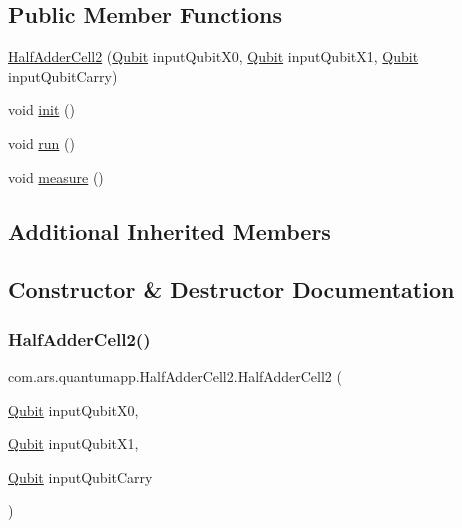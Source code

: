 \subsection*{Public Member Functions}
\begin{DoxyCompactItemize}
\item 
\hyperlink{classcom_1_1ars_1_1quantumapp_1_1_half_adder_cell2_a1369d2837b586d8e6076476b7ea03058}{Half\+Adder\+Cell2} (\hyperlink{classcom_1_1ars_1_1qubits_1_1_qubit}{Qubit} input\+Qubit\+X0, \hyperlink{classcom_1_1ars_1_1qubits_1_1_qubit}{Qubit} input\+Qubit\+X1, \hyperlink{classcom_1_1ars_1_1qubits_1_1_qubit}{Qubit} input\+Qubit\+Carry)
\item 
void \hyperlink{classcom_1_1ars_1_1quantumapp_1_1_half_adder_cell2_a9962ffb8cd54b25f0c696e7c06882195}{init} ()
\item 
void \hyperlink{classcom_1_1ars_1_1quantumapp_1_1_half_adder_cell2_a4552a018b3fdd228fb7d851be827754c}{run} ()
\item 
void \hyperlink{classcom_1_1ars_1_1quantumapp_1_1_half_adder_cell2_ace7018ecff35605ac317049d2584db13}{measure} ()
\end{DoxyCompactItemize}
\subsection*{Additional Inherited Members}


\subsection{Constructor \& Destructor Documentation}
\hypertarget{classcom_1_1ars_1_1quantumapp_1_1_half_adder_cell2_a1369d2837b586d8e6076476b7ea03058}{}\label{classcom_1_1ars_1_1quantumapp_1_1_half_adder_cell2_a1369d2837b586d8e6076476b7ea03058} 
\subsubsection{\texorpdfstring{Half\+Adder\+Cell2()}{HalfAdderCell2()}}
{\footnotesize\ttfamily com.\+ars.\+quantumapp.\+Half\+Adder\+Cell2.\+Half\+Adder\+Cell2 (\begin{DoxyParamCaption}\item[{\hyperlink{classcom_1_1ars_1_1qubits_1_1_qubit}{Qubit}}]{input\+Qubit\+X0,  }\item[{\hyperlink{classcom_1_1ars_1_1qubits_1_1_qubit}{Qubit}}]{input\+Qubit\+X1,  }\item[{\hyperlink{classcom_1_1ars_1_1qubits_1_1_qubit}{Qubit}}]{input\+Qubit\+Carry }\end{DoxyParamCaption})}



